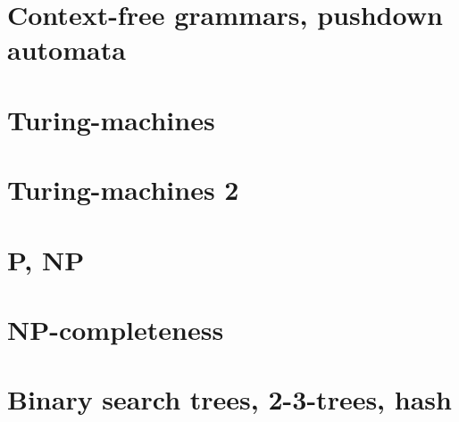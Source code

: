 \documentclass[a4paper]{article}
\begin{document}
\section{Context-free grammars, pushdown automata}
\pagebreak
\pagebreak
\pagebreak
\pagebreak
\pagebreak
\pagebreak
\pagebreak
\pagebreak
\pagebreak
\pagebreak
\pagebreak
\pagebreak

\section{Turing-machines}
\pagebreak
\pagebreak
\pagebreak
\pagebreak
\pagebreak
\pagebreak
\pagebreak
\pagebreak
\pagebreak

\section{Turing-machines 2}
\pagebreak
\pagebreak
\pagebreak
\pagebreak
\pagebreak
\pagebreak
\pagebreak
\pagebreak

\section{P, NP}
\pagebreak
\pagebreak
\pagebreak
\pagebreak
\pagebreak
\pagebreak
\pagebreak
\pagebreak
\pagebreak

\section{NP-completeness}
\pagebreak
\pagebreak
\pagebreak
\pagebreak
\pagebreak
\pagebreak
\pagebreak
\pagebreak
\pagebreak
\pagebreak
\pagebreak
\pagebreak
\pagebreak


\section{}
\section{}
\section{}
\section{}
\section{Binary search trees, 2-3-trees, hash}
\pagebreak
\end{document}
